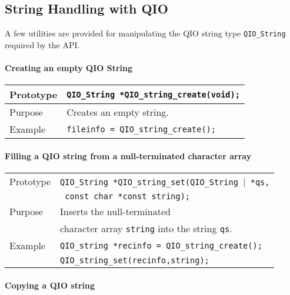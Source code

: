 \documentclass{article}
\newcommand{\QIOstring}{{\tt QIO\_String }}
\begin{document}
\subsection{String Handling with QIO}

 A few utilities are provided for manipulating the QIO string type
\QIOstring required by the API\@.

\paragraph{Creating an empty QIO String}

\begin{flushleft}
  \begin{tabular}{|l|l|}
  \hline
  Prototype      & \QIOstring \verb|*QIO_string_create(void);|\\
    \hline
  Purpose        & Creates an empty string. \\
   \hline
  Example        & \verb|fileinfo = QIO_string_create();| \\
   \hline
 \end{tabular}
\end{flushleft}
%
\paragraph{Filling a QIO string from a null-terminated character array}

\begin{flushleft}
  \begin{tabular}{|l|l|}
  \hline
  Prototype      & \QIOstring \verb|*QIO_string_set(|\QIOstring|\verb| *qs,| \\
                 & \verb| const char *const string);|\\
    \hline
  Purpose        & Inserts the null-terminated \\
                 & character array \verb|string| into the string \verb|qs|. \\
   \hline
  Example        & \verb|QIO_string *recinfo = QIO_string_create();| \\
                 & \verb|QIO_string_set(recinfo,string);| \\
   \hline
 \end{tabular}
\end{flushleft}
%
\paragraph{Copying a QIO string}
\end{document}
